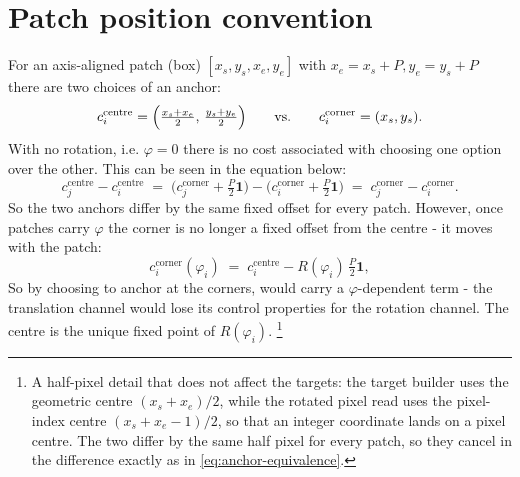 \documentclass[final_report.tex]{subfiles}
\begin{document}
\section{Patch position convention}\label{sec:position-convention}
For an axis-aligned patch (box) $[x_s,y_s,x_e,y_e]$ with $x_e=x_s+P,y_e=y_s+P$ there are two choices of an anchor:
\begin{equation}\label{eq:anchors}
  c_i^{\text{centre}} = \Bigl(\tfrac{x_s + x_e}{2},\, \tfrac{y_s + y_e}{2}\Bigr)
  \qquad\text{vs.}\qquad
  c_i^{\text{corner}} = (x_s, y_s).
\end{equation}
With no rotation, i.e. $\varphi=0$ there is no cost associated with choosing one option over the other. This can be seen in the equation below:
\begin{equation}\label{eq:anchor-equivalence}
  c^{\text{centre}}_j - c^{\text{centre}}_i
  \;=\; \bigl(c^{\text{corner}}_j + \tfrac{P}{2}\mathbf{1}\bigr) - \bigl(c^{\text{corner}}_i + \tfrac{P}{2}\mathbf{1}\bigr)
  \;=\; c^{\text{corner}}_j - c^{\text{corner}}_i .
\end{equation}
So the two anchors differ by the same fixed offset for every patch. However, once patches carry $\varphi$ the corner is no longer a fixed offset from the centre - it moves with the patch:
\begin{equation}\label{eq:corner-entangles}
  c^{\text{corner}}_i(\varphi_i) \;=\; c^{\text{centre}}_i - R(\varphi_i)\,\tfrac{P}{2}\mathbf{1},
\end{equation}
So by choosing to anchor at the corners, \dxy{} would carry a $\varphi$-dependent term - the translation channel would lose its control properties for the rotation channel. The centre is the unique fixed point of $R(\varphi_i)$.%
\footnote{A half-pixel detail that does not affect the targets: the target builder uses the
geometric centre $(x_s + x_e)/2$, while the rotated pixel read uses the pixel-index centre
$(x_s + x_e - 1)/2$, so that an integer coordinate lands on a pixel centre. The two differ by
the same half pixel for every patch, so they cancel in the difference exactly as in
\cref{eq:anchor-equivalence}.}
\end{document}
